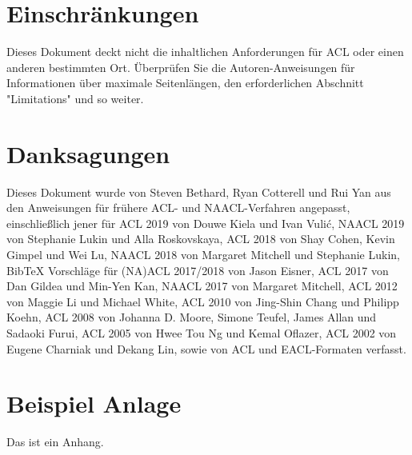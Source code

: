 \documentclass[11pt]{article}
\begin{document}
\section*{Einschränkungen}

Dieses Dokument deckt nicht die inhaltlichen Anforderungen für ACL oder einen anderen bestimmten Ort. Überprüfen Sie die Autoren-Anweisungen für Informationen über maximale Seitenlängen, den erforderlichen Abschnitt "Limitations" und so weiter.

\section*{Danksagungen}

Dieses Dokument wurde von Steven Bethard, Ryan Cotterell und Rui Yan aus den Anweisungen für frühere ACL- und NAACL-Verfahren angepasst, einschließlich jener für ACL 2019 von Douwe Kiela und Ivan Vulić, NAACL 2019 von Stephanie Lukin und Alla Roskovskaya, ACL 2018 von Shay Cohen, Kevin Gimpel und Wei Lu, NAACL 2018 von Margaret Mitchell und Stephanie Lukin, Bib\TeX{} Vorschläge für (NA)ACL 2017/2018 von Jason Eisner, ACL 2017 von Dan Gildea und Min-Yen Kan, NAACL 2017 von Margaret Mitchell, ACL 2012 von Maggie Li und Michael White, ACL 2010 von Jing-Shin Chang und Philipp Koehn, ACL 2008 von Johanna D. Moore, Simone Teufel, James Allan und Sadaoki Furui, ACL 2005 von Hwee Tou Ng und Kemal Oflazer, ACL 2002 von Eugene Charniak und Dekang Lin, sowie von ACL und EACL-Formaten verfasst.

%



\appendix

\section{Beispiel Anlage}
\label{sec:appendix}

Das ist ein Anhang.
\end{document}
